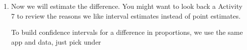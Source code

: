 \begin{enumerate}
\begin{enumerate}
\begin{key}
    \end{key}
       State your conclusion about $H_0$ in the context of this
       situation. Be as specific   as possible about the true
       proportions overestimating their weight.
\begin{students}
 \ \   \vspace*{2cm}\\
\end{students}
\begin{key}
   {\it We conclude that when people are wrong about their weight, a
     much larger proportion of women than men say they are over,
     rather than under weight.}
\end{key}
\end{enumerate}

\item Now we will estimate the difference.  You might want to look
   back a Activity 7 to review the reasons we like interval estimates
   instead of point estimates.

   To build confidence intervals for a difference in proportions, we
   use the same app and data, just pick  under 


\end{enumerate}
